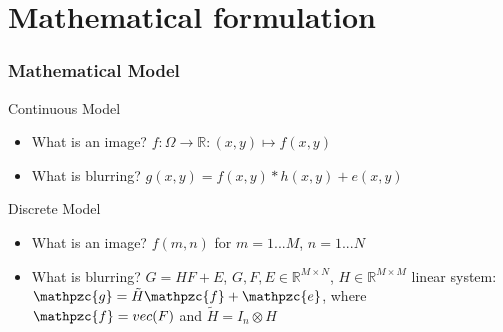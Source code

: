 \section[Math. Formulat.]{Mathematical formulation}

\begin{frame}
	\frametitle{Mathematical Model}
	Continuous Model
	\begin{itemize}
	\item What is an image? $f:\Omega \rightarrow \mathbb{R}: (x,y) \mapsto f(x,y)$
	\item What is blurring? $g(x,y) = f(x,y) \ast h(x,y) + e(x,y)$
	\end{itemize}
	Discrete Model
	\begin{itemize}
	\item What is an image? $f(m,n)$ for $m=1...M$, $n=1...N$
	\item What is blurring? $G = HF + E$, $G,F,E \in \mathbb{R}^{M \times N}$, $H \in \mathbb{R}^{M \times M}$
	linear system: $\mathpzc{g} = \tilde{H}\mathpzc{f} + \mathpzc{e}$, where $\mathpzc{f} = vec(F)$ and $\tilde{H} = I_n \otimes H$
	\end{itemize}
\end{frame}

